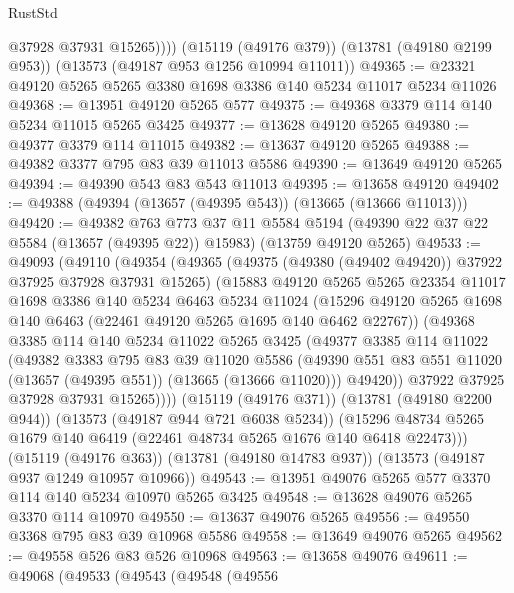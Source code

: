 \begin{lexlean}{RustStd}
\begin{coremodule}
            @37928
            @37931
            @15265))))
    (@15119 (@49176 @379))
    (@13781 (@49180 @2199 @953))
    (@13573 (@49187 @953 @1256 @10994 @11011))
@49365 := @23321 @49120 @5265 @5265 @3380 @1698 @3386 @140 @5234 @11017 @5234 @11026
@49368 := @13951 @49120 @5265 @577
@49375 := @49368 @3379 @114 @140 @5234 @11015 @5265 @3425
@49377 := @13628 @49120 @5265
@49380 := @49377 @3379 @114 @11015
@49382 := @13637 @49120 @5265
@49388 := @49382 @3377 @795 @83 @39 @11013 @5586
@49390 := @13649 @49120 @5265
@49394 := @49390 @543 @83 @543 @11013
@49395 := @13658 @49120
@49402 := @49388 (@49394 (@13657 (@49395 @543)) (@13665 (@13666 @11013)))
@49420 := @49382
    @763
    @773
    @37
    @11
    @5584
    @5194
    (@49390 @22 @37 @22 @5584 (@13657 (@49395 @22)) @15983)
    (@13759 @49120 @5265)
@49533 := @49093
    (@49110
      (@49354
        (@49365
          (@49375 (@49380 (@49402 @49420)) @37922 @37925 @37928 @37931 @15265)
          (@15883
            @49120
            @5265
            @5265
            @23354
            @11017
            @1698
            @3386
            @140
            @5234
            @6463
            @5234
            @11024
            (@15296 @49120 @5265 @1698 @140 @6463 (@22461 @49120 @5265 @1695 @140 @6462 @22767))
            (@49368
              @3385
              @114
              @140
              @5234
              @11022
              @5265
              @3425
              (@49377
                @3385
                @114
                @11022
                (@49382
                  @3383
                  @795
                  @83
                  @39
                  @11020
                  @5586
                  (@49390 @551 @83 @551 @11020 (@13657 (@49395 @551)) (@13665 (@13666 @11020)))
                  @49420))
              @37922
              @37925
              @37928
              @37931
              @15265))))
      (@15119 (@49176 @371))
      (@13781 (@49180 @2200 @944))
      (@13573 (@49187 @944 @721 @6038 @5234))
      (@15296 @48734 @5265 @1679 @140 @6419 (@22461 @48734 @5265 @1676 @140 @6418 @22473)))
    (@15119 (@49176 @363))
    (@13781 (@49180 @14783 @937))
    (@13573 (@49187 @937 @1249 @10957 @10966))
@49543 := @13951 @49076 @5265 @577 @3370 @114 @140 @5234 @10970 @5265 @3425
@49548 := @13628 @49076 @5265 @3370 @114 @10970
@49550 := @13637 @49076 @5265
@49556 := @49550 @3368 @795 @83 @39 @10968 @5586
@49558 := @13649 @49076 @5265
@49562 := @49558 @526 @83 @526 @10968
@49563 := @13658 @49076
@49611 := @49068
    (@49533
      (@49543
        (@49548
          (@49556

\end{coremodule}
\end{lexlean}
